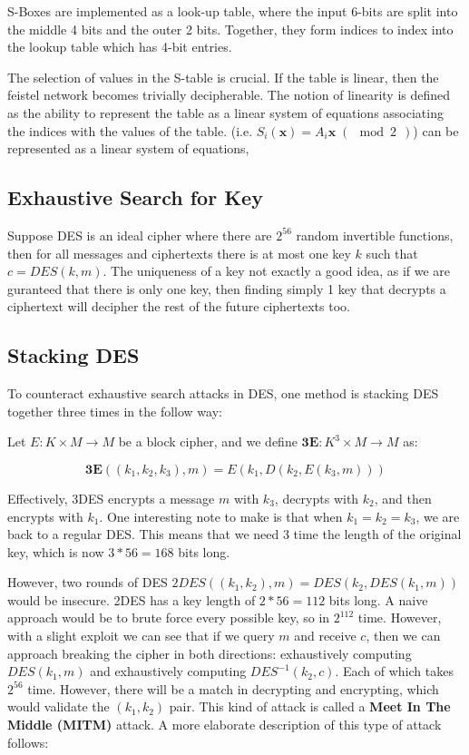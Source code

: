 \documentclass{article}
\begin{document}
\begin{multicols}{2}
S-Boxes are implemented as a look-up table, where the input 6-bits are split into the middle 4 bits and the outer 2 bits. Together, they form indices to index into the lookup table which has 4-bit entries.

The selection of values in the S-table is crucial. If the table is linear, then the feistel network becomes trivially decipherable. The notion of linearity is defined as the ability to represent the table as a linear system of equations associating the indices with the values of the table. (i.e. $S_i(\mathbf{x}) = A_i \mathbf{x} \;(\mod 2\,\;)$) can be represented as a linear system of equations, 

\subsection{Exhaustive Search for Key}

Suppose DES is an ideal cipher where there are $2^{56}$ random invertible functions, then for all messages and ciphertexts there is at most one key $k$ such that $c = DES(k,m)$. The uniqueness of a key not exactly a good idea, as if we are guranteed that there is only one key, then finding simply 1 key that decrypts a ciphertext will decipher the rest of the future ciphertexts too.

\subsection{Stacking DES}

To counteract exhaustive search attacks in DES, one method is stacking DES together three times in the follow way:

Let $E: K \times M \rightarrow M$ be a block cipher, and we define $\mathbf{3E} : K^3 \times M \rightarrow M$ as:

$$
\mathbf{3E}((k_1,k_2,k_3), m) = E(k_1, D(k_2, E(k_3, m)))
$$

Effectively, 3DES encrypts a message $m$ with $k_3$, decrypts with $k_2$, and then encrypts with $k_1$. One interesting note to make is that when $k_1 = k_2 = k_3$, we are back to a regular DES. This means that we need 3 time the length of the original key, which is now $3*56 = 168$ bits long.

However, two rounds of DES $2DES((k_1, k_2),m) = DES(k_2,DES(k_1,m))$ would be insecure. 2DES has a key length of $2*56 = 112$ bits long. A naive approach would be to brute force every possible key, so in $2^{112}$ time. However, with a slight exploit we can see that if we query $m$ and receive $c$, then we can approach breaking the cipher in both directions: exhaustively computing $DES(k_1,m)$ and exhaustively computing $DES^{-1}(k_2,c)$. Each of which takes $2^{56}$ time. However, there will be a match in decrypting and encrypting, which would validate the $(k_1, k_2)$ pair. This kind of attack is called a \textbf{Meet In The Middle (MITM)} attack. A more elaborate description of this type of attack follows:


\end{multicols}
\end{document}
